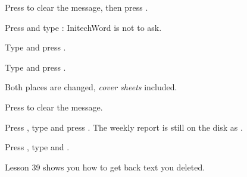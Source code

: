 \begin{WPSteps}
\item Press  to clear the message, then press
.
\item Press  and type : InitechWord is
not to ask.
\item Type  and press .
\item Type  and press .
\end{WPSteps}
Both places are changed, \textit{cover sheets} included.

\begin{WPSteps}
\item Press  to clear the message.
\item Press , type  and press
.  The weekly report is still on the disk as
.
\item Press , type  and .
\end{WPSteps}
\EndReplay
Lesson 39 shows you how to get back text you deleted.
